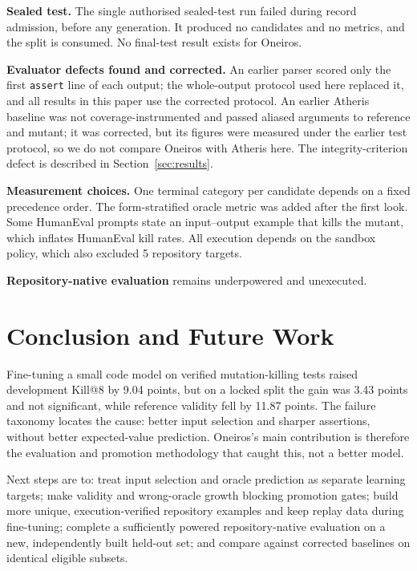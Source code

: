 \documentclass[conference,a4paper]{IEEEtran}
\makeatletter
\newcommand{\killk}[1]{Kill@#1}
\makeatother
\begin{document}
\textbf{Sealed test.} The single authorised sealed-test run failed during record
admission, before any generation. It produced no candidates and no metrics, and the
split is consumed. No final-test result exists for Oneiros.

\textbf{Evaluator defects found and corrected.} An earlier parser scored only the first
\texttt{assert} line of each output; the whole-output protocol used here replaced it,
and all results in this paper use the corrected protocol. An earlier Atheris baseline
was not coverage-instrumented and passed aliased arguments to reference and mutant; it
was corrected, but its figures were measured under the earlier test protocol, so we do
not compare Oneiros with Atheris here. The integrity-criterion defect is described in
Section~\ref{sec:results}.

\textbf{Measurement choices.} One terminal category per candidate depends on a fixed
precedence order. The form-stratified oracle metric was added after the first look.
Some HumanEval prompts state an input--output example that kills the mutant, which
inflates HumanEval kill rates. All execution depends on the sandbox policy, which also
excluded 5 repository targets.

\textbf{Repository-native evaluation} remains underpowered and unexecuted.

\section{Conclusion and Future Work}

Fine-tuning a small code model on verified mutation-killing tests raised development
\killk{8} by 9.04 points, but on a locked split the gain was 3.43 points and not
significant, while reference validity fell by 11.87 points. The failure taxonomy
locates the cause: better input selection and sharper assertions, without better
expected-value prediction. Oneiros's main contribution is therefore the evaluation and
promotion methodology that caught this, not a better model.

Next steps are to: treat input selection and oracle prediction as separate learning
targets; make validity and wrong-oracle growth blocking promotion gates; build more
unique, execution-verified repository examples and keep replay data during
fine-tuning; complete a sufficiently powered repository-native evaluation on a new,
independently built held-out set; and compare against corrected baselines on identical
eligible subsets.
\end{document}

